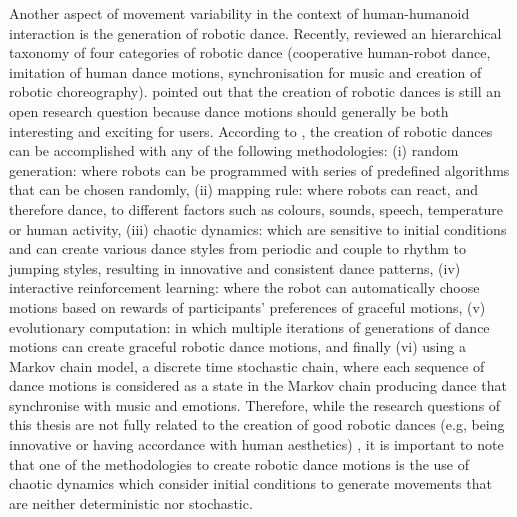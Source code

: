 Another aspect of movement variability in the context of human-humanoid 
interaction is the generation of robotic dance.
Recently, \cite{peng2015} reviewed an hierarchical taxonomy of 
four categories of robotic dance (cooperative human-robot dance, 
imitation of human dance motions, synchronisation for music and 
creation of robotic choreography).
\cite{peng2015} pointed out that the creation of robotic dances is still 
an open research question because dance motions should generally be both 
interesting and exciting for users. 
According to \cite{peng2015}, the creation of robotic dances can be 
accomplished with any of the following methodologies:
(i) random generation: where robots can be 
programmed with series of predefined algorithms that can be chosen randomly,
(ii) mapping rule:  where robots can react, and therefore dance, to different 
factors such as colours, sounds, speech, temperature or human activity,
(iii) chaotic dynamics: which are sensitive to initial conditions and 
can create various dance styles from periodic and couple to rhythm to 
jumping styles, resulting in innovative and consistent dance patterns,
(iv) interactive reinforcement learning: where the robot can automatically 
choose motions based on rewards of participants' 
preferences of graceful motions,
(v) evolutionary computation: in which multiple iterations of generations
of dance motions can create graceful robotic dance motions, and
finally (vi) using a Markov chain model, a discrete time stochastic chain, 
where each sequence of dance motions is considered as a state in the Markov 
chain producing dance that synchronise with music and emotions.
Therefore, while the research questions of this thesis are not fully related 
to the creation of good robotic dances (e.g, being innovative or having 
accordance with human aesthetics) \citep{peng2015}, it is important to note 
that one of the methodologies to create robotic dance motions is the use of 
chaotic dynamics
which consider initial conditions to generate movements 
that are neither deterministic nor stochastic.


